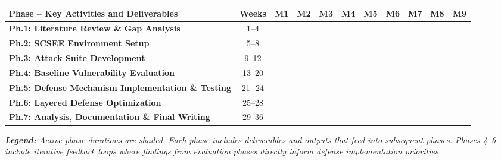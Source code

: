 \documentclass[12pt,a4paper]{article}
\newcommand{\done}{\cellcolor{primarycolor}} %
\begin{document}
\begin{table}[h]
\centering
\begin{tabular}{|>{\raggedright\arraybackslash}p{5.5cm} | c | *{9}{c|} } %
\hline %
\textbf{Phase -- Key Activities and Deliverables} & \textbf{Weeks} 
& \textbf{M1} & \textbf{M2} & \textbf{M3} & \textbf{M4} & \textbf{M5} 
& \textbf{M6} & \textbf{M7} & \textbf{M8} & \textbf{M9} \\ \hline \hline

\textbf{Ph.1: Literature Review \& Gap Analysis} \newline \footnotesize 
& 1--4 & \done  & & & & & & & & \\ \hline

\textbf{Ph.2: SCSEE Environment Setup} \newline \footnotesize 
& 5--8 &  & \done & & & & & & &\\ \hline

\textbf{Ph.3: Attack Suite Development} \newline \footnotesize 
& 9--12 & & & \done & & & & & &\\ \hline

\textbf{Ph.4: Baseline Vulnerability Evaluation} \newline \footnotesize 
& 13--20 & & & & \done &  \done & & & &    \\ \hline

\textbf{Ph.5: Defense Mechanism Implementation \& Testing} \newline \footnotesize  
& 21- 24 & & & & & & \done & & &  \\ \hline

\textbf{Ph.6: Layered Defense Optimization} \newline \footnotesize  & 25--28 & & & & & & & \done & & \\ \hline

\textbf{Ph.7: Analysis, Documentation \& Final Writing} \newline \footnotesize  & 29–36 & & & & & & & & \done & \done \\ \hline
\bottomrule
\end{tabular}
\end{table}

\vspace{0.2cm}
\noindent \textit{\small \textbf{Legend:} Active phase durations are shaded. Each phase includes deliverables and outputs that feed into subsequent phases. Phases 4–6 include iterative feedback loops where findings from evaluation phases directly inform defense implementation priorities.}
\end{document}
